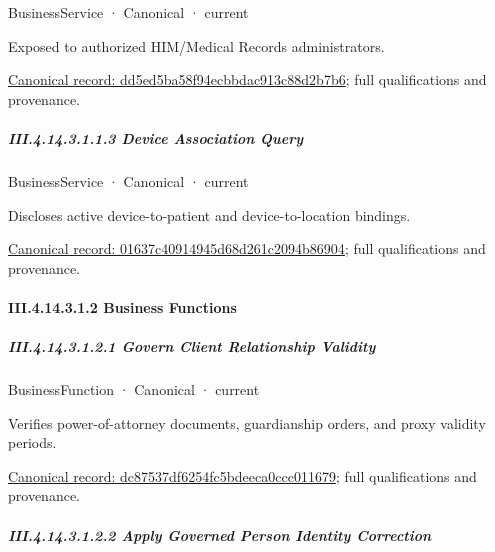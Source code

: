 \label{element:dd5ed5ba58f94ecbbdac913c88d2b7b6}
{\small BusinessService · Canonical · current}\par

Exposed to authorized HIM/Medical Records administrators.


{\footnotesize \href{../../../../../../../../continuum/business/business-service/dd5ed5ba58f94ecbbdac913c88d2b7b6.md}{Canonical record: dd5ed5ba58f94ecbbdac913c88d2b7b6}; full qualifications and provenance.}\par
\subparagraph*{III.4.14.3.1.1.3 Device Association Query}
\label{navigation:III.4.14.3.1.1.3}

\label{element:01637c40914945d68d261c2094b86904}
{\small BusinessService · Canonical · current}\par

Discloses active device-to-patient and device-to-location bindings.


{\footnotesize \href{../../../../../../../../continuum/business/business-service/01637c40914945d68d261c2094b86904.md}{Canonical record: 01637c40914945d68d261c2094b86904}; full qualifications and provenance.}\par
\paragraph*{III.4.14.3.1.2 Business Functions}
\label{navigation:III.4.14.3.1.2}

\subparagraph*{III.4.14.3.1.2.1 Govern Client Relationship Validity}
\label{navigation:III.4.14.3.1.2.1}

\label{element:dc87537df6254fc5bdeeca0ccc011679}
{\small BusinessFunction · Canonical · current}\par

Verifies power-of-attorney documents, guardianship orders, and proxy validity periods.


{\footnotesize \href{../../../../../../../../continuum/business/business-function/dc87537df6254fc5bdeeca0ccc011679.md}{Canonical record: dc87537df6254fc5bdeeca0ccc011679}; full qualifications and provenance.}\par
\subparagraph*{III.4.14.3.1.2.2 Apply Governed Person Identity Correction}
\label{navigation:III.4.14.3.1.2.2}


